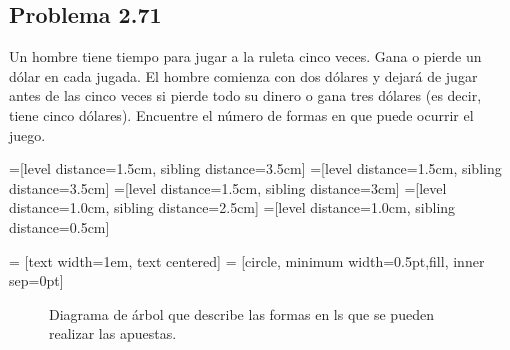 \documentclass[12pt]{article}
\begin{document}
\subsection*{Problema 2.71}
Un hombre tiene tiempo para jugar a la ruleta cinco veces. Gana o pierde un
dólar en cada jugada. El hombre comienza con dos dólares y dejará de jugar antes
de las cinco veces si pierde todo su dinero o gana tres dólares (es decir, tiene
cinco dólares). Encuentre el número de formas en que puede ocurrir el juego.

=[level distance=1.5cm, sibling distance=3.5cm]
=[level distance=1.5cm, sibling distance=3.5cm]
=[level distance=1.5cm, sibling distance=3cm]
=[level distance=1.0cm, sibling distance=2.5cm]
=[level distance=1.0cm, sibling distance=0.5cm]

 = [text width=1em, text centered]
 = [circle, minimum width=0.5pt,fill, inner sep=0pt]

\begin{figure}[h]
    \centering
{}
\caption{Diagrama de árbol que describe las formas en ls que se pueden realizar
las apuestas.}
\end{figure}
\end{document}

